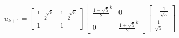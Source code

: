 \documentclass[preview]{standalone}
\begin{document}
\begin{center}
$$u_{k + 1} = \begin{bmatrix} \frac{1 - \sqrt{5}}{2} & \frac{1 + \sqrt{5}}{2} \\ 1 & 1 \end{bmatrix} \begin{bmatrix} \frac{1 - \sqrt{5}}{2}^k &  0 \\ 0 & \frac{1 + \sqrt{5}}{2}^k \end{bmatrix}  \begin{bmatrix} -\frac{1}{\sqrt{5}} \\ \frac{1}{\sqrt{5}} \end{bmatrix}$$
\end{center}
\end{document}
